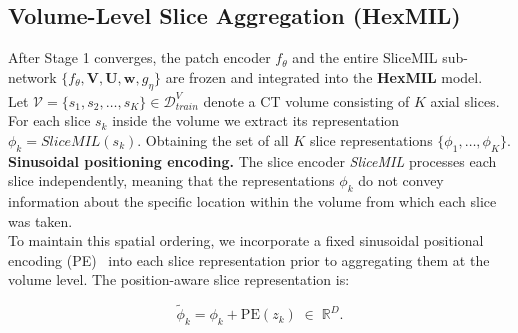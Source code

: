 \documentclass[sigconf, screen, review, anonymous]{acmart}
\begin{document}
\subsection{Volume-Level Slice Aggregation (HexMIL)}
\label{sec:volume}

After Stage 1 converges, the patch encoder $f_\theta$ and the entire SliceMIL sub-network $\{f_\theta,\mathbf{V},\mathbf{U},\mathbf{w},g_\eta\}$ are frozen and integrated into the \textbf{HexMIL} model.\\
Let $\mathcal{V} = \{s_1, s_2, \ldots, s_K\} \in \mathcal{D}^V_{train}$ denote a CT volume consisting of $K$ axial slices. For each slice $s_k$ inside the volume we extract its representation $\phi_k = \textit{SliceMIL}(s_k)$. Obtaining the set of all $K$ slice representations $\{\phi_1, \ldots, \phi_K\}$.\\
%
\smallskip
\noindent\textbf{Sinusoidal positioning encoding.} 
The slice encoder \textit{SliceMIL} processes each slice independently, meaning that the representations $\phi_k$ do not convey information about the specific location within the volume from which each slice was taken.\\
To maintain this spatial ordering, we incorporate a fixed sinusoidal  positional encoding (PE)~\cite{vaswani2017attention} into each slice representation prior to aggregating them at the volume level. The position-aware slice representation is:

\begin{equation}
    \tilde{\phi}_k = \phi_k + \mathrm{PE}(z_k) \;\in\; \mathbb{R}^{D}. \label{eq:pe_add}
\end{equation}
\end{document}
